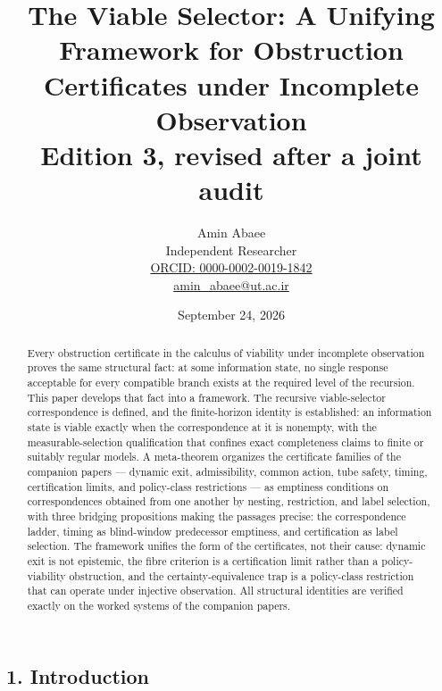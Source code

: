 \documentclass[10pt,twocolumn]{article}
\theoremstyle{definition}
\begin{document}
\title{The Viable Selector: A Unifying Framework for Obstruction\\ Certificates under Incomplete Observation\\[0.2em]
{\large\rmfamily Edition 3, revised after a joint audit}}
\author{Amin Abaee\\[0.35em]
{\small Independent Researcher}\\[0.55em]
{\small\href{https://orcid.org/0000-0002-0019-1842}{ORCID: 0000-0002-0019-1842}}\\[0.3em]
{\small\href{mailto:amin\_abaee@ut.ac.ir}{amin\_abaee@ut.ac.ir}}}
\date{September 24, 2026}
\maketitle

\begin{abstract}

Every obstruction certificate in the calculus of viability under incomplete
observation proves the same structural fact: at some information state, no
single response acceptable for every compatible branch exists at the
required level of the recursion. This paper develops that fact into a
framework. The recursive viable-selector correspondence is defined, and the
finite-horizon identity is established: an information state is viable
exactly when the correspondence at it is nonempty, with the measurable-selection
qualification that confines exact completeness claims to finite or suitably
regular models. A meta-theorem organizes the certificate families of the
companion papers --- dynamic exit, admissibility, common action, tube safety,
timing, certification limits, and policy-class restrictions --- as emptiness
conditions on correspondences obtained from one another by nesting,
restriction, and label selection, with three bridging propositions making
the passages precise: the correspondence ladder, timing as blind-window
predecessor emptiness, and certification as label selection. The framework
unifies the form of the certificates, not their cause: dynamic exit is not
epistemic, the fibre criterion is a certification limit rather than a
policy-viability obstruction, and the certainty-equivalence trap is a
policy-class restriction that can operate under injective observation. All
structural identities are verified exactly on the worked systems of the
companion papers.

\end{abstract}

\subsection{1. Introduction}\label{introduction}
\end{document}
